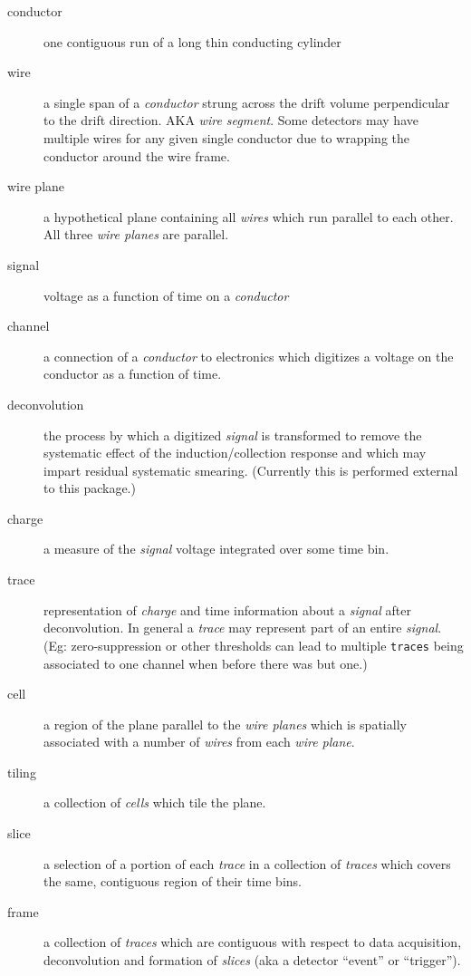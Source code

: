 \documentclass[letter]{article}
\begin{document}
\begin{description}
\item[conductor] one contiguous run of a long thin conducting cylinder  
\item[wire] a single span of a \textit{conductor} strung across the drift
  volume perpendicular to the drift direction.
  AKA \textit{wire segment}.
  Some detectors may have multiple wires for any given single
  conductor due to wrapping the conductor around the wire frame.
\item[wire plane] a hypothetical plane containing all \textit{wires} which run
  parallel to each other.
  All three \textit{wire planes} are parallel.
\item[signal] voltage as a function of time on a \textit{conductor}
\item[channel] a connection of a \textit{conductor} to electronics
  which digitizes a voltage on the conductor as a function of time.
\item[deconvolution] the process by which a digitized \textit{signal} is
  transformed to remove the systematic effect of the
  induction/collection response and which may impart residual
  systematic smearing.
  (Currently this is performed external to this package.)
\item[charge] a measure of the \textit{signal} voltage integrated over
  some time bin.
\item[trace] representation of \textit{charge} and
  time information about a \textit{signal} after deconvolution.
  In general a \textit{trace} may represent part of an entire
  \textit{signal}.
  (Eg: zero-suppression or other thresholds can lead to multiple
  \texttt{traces} being associated to one channel when before there
  was but one.)
\item[cell] a region of the plane parallel to the \textit{wire planes}
  which is spatially associated with a number of \textit{wires} from
  each \textit{wire plane}.
\item[tiling] a collection of \textit{cells} which tile the plane.
\item[slice] a selection of a portion of each \textit{trace} in a
  collection of \textit{traces} which covers the same, contiguous
  region of their time bins.
\item[frame] a collection of \textit{traces} which are contiguous with
  respect to data acquisition, deconvolution and formation of
  \textit{slices} (aka a detector ``event'' or ``trigger'').
\end{description}
\end{document}
